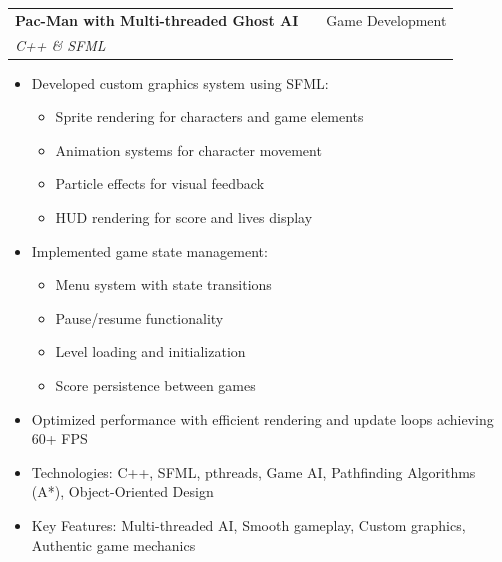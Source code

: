 \documentclass[a4paper,12pt]{article}
\makeatletter
\newenvironment{projectdetailed}[3]
    {
    \begin{tabularx}{\linewidth}{@{}l X r@{}}
    \textbf{#1} & \hfill & #2 \\
    \textit{#3} & & \\[3.75pt]
    \end{tabularx}
    \begin{minipage}[t]{\linewidth}
    \begin{itemize}[nosep,after=\strut, leftmargin=1em, itemsep=2pt,label=--]
    }
    {
    \end{itemize}
    \end{minipage}
    \vspace{6pt}
    }
\makeatother
\begin{document}
\begin{projectdetailed}{Pac-Man with Multi-threaded Ghost AI}{Game Development}{C++ \& SFML}
\begin{itemize}[nosep, leftmargin=2em]
    \item A* pathfinding for intelligent ghost movement
    \item Tile-based navigation with wall avoidance
    \item Dynamic path recalculation based on player movement
\end{itemize}
\item Developed custom graphics system using SFML:
\begin{itemize}[nosep, leftmargin=2em]
    \item Sprite rendering for characters and game elements
    \item Animation systems for character movement
    \item Particle effects for visual feedback
    \item HUD rendering for score and lives display
\end{itemize}
\item Implemented game state management:
\begin{itemize}[nosep, leftmargin=2em]
    \item Menu system with state transitions
    \item Pause/resume functionality
    \item Level loading and initialization
    \item Score persistence between games
\end{itemize}
\item Optimized performance with efficient rendering and update loops achieving 60+ FPS
\item Technologies: C++, SFML, pthreads, Game AI, Pathfinding Algorithms (A*), Object-Oriented Design
\item Key Features: Multi-threaded AI, Smooth gameplay, Custom graphics, Authentic game mechanics
\end{projectdetailed}
\end{document}
